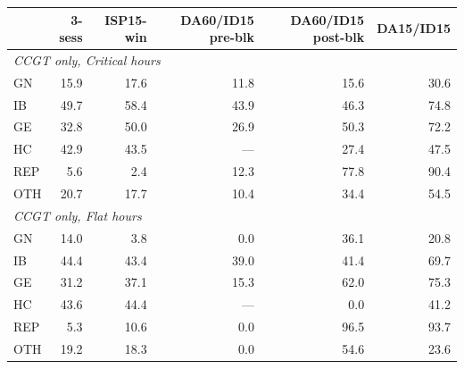 \begin{tabular}{l r r r r r}
\toprule
 & 3-sess & ISP15-win & DA60/ID15 pre-blk & DA60/ID15 post-blk & DA15/ID15 \\
\midrule
\multicolumn{6}{l}{\textit{CCGT only, Critical hours}} \\
GN & 15.9 & 17.6 & 11.8 & 15.6 & 30.6 \\
IB & 49.7 & 58.4 & 43.9 & 46.3 & 74.8 \\
GE & 32.8 & 50.0 & 26.9 & 50.3 & 72.2 \\
HC & 42.9 & 43.5 & --- & 27.4 & 47.5 \\
REP & 5.6 & 2.4 & 12.3 & 77.8 & 90.4 \\
OTH & 20.7 & 17.7 & 10.4 & 34.4 & 54.5 \\
\midrule
\multicolumn{6}{l}{\textit{CCGT only, Flat hours}} \\
GN & 14.0 & 3.8 & 0.0 & 36.1 & 20.8 \\
IB & 44.4 & 43.4 & 39.0 & 41.4 & 69.7 \\
GE & 31.2 & 37.1 & 15.3 & 62.0 & 75.3 \\
HC & 43.6 & 44.4 & --- & 0.0 & 41.2 \\
REP & 5.3 & 10.6 & 0.0 & 96.5 & 93.7 \\
OTH & 19.2 & 18.3 & 0.0 & 54.6 & 23.6 \\
\midrule
\bottomrule
\end{tabular}

